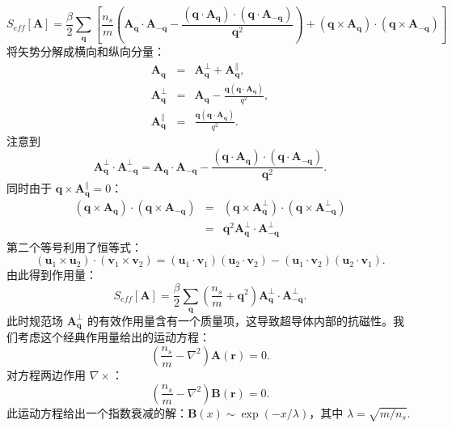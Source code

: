 \documentclass[10pt,UTF8]{ctexart}
\begin{document}
\begin{equation}
	S_{eff}[\bm A]=\frac{\beta}{2}\sum_{\bm q}\left[\frac{n_s}{m} \left(\bm A_{\bm q}\cdot \bm A_{-\bm q}-\frac{(\bm q\cdot \bm A_{\bm q})\cdot(\bm q\cdot \bm A_{-\bm q})}{\bm q^2} \right) + (\bm q \times \bm A_{\bm q})\cdot(\bm q \times \bm A_{-\bm q})\right]
\end{equation}
将矢势分解成横向和纵向分量：
\begin{eqnarray}
	\bm A_{\bm q} &=& \bm A_{\bm q}^\perp + \bm A_{\bm q}^\parallel, \nonumber \\
	\bm A_{\bm q}^\perp &=& \bm A_{\bm q} - \frac{\bm q(\bm q \cdot \bm A_{\bm q})}{q^2}, \nonumber \\
	\bm A_{\bm q}^\parallel &=& \frac{\bm q(\bm q \cdot \bm A_{\bm q})}{q^2}.
\end{eqnarray}
注意到
\begin{equation}
	\bm A_{\bm q}^\perp \cdot \bm A_{-\bm q}^\perp 
	= \bm A_{\bm q}\cdot \bm A_{-\bm q}-\frac{(\bm q\cdot \bm A_{\bm q})\cdot(\bm q\cdot \bm A_{-\bm q})}{\bm q^2}.
\end{equation}
同时由于 $\bm q \times \bm A_{\bm q}^\parallel = 0$：
\begin{eqnarray}
	(\bm q\times \bm A_{\bm q})\cdot(\bm q \times \bm A_{-\bm q})
	&=& (\bm q\times \bm A_{\bm q}^\perp)\cdot(\bm q \times \bm A_{-\bm q}^\perp) \nonumber \\
	&=& \bm q^2 \bm A_{\bm q}^\perp \cdot \bm A_{-\bm q}^\perp
\end{eqnarray}
第二个等号利用了恒等式：
\begin{equation}
	(\bm u_1 \times \bm u_2)\cdot(\bm v_1 \times \bm v_2) 
	= (\bm u_1 \cdot \bm v_1)(\bm u_2 \cdot \bm v_2)
	- (\bm u_1 \cdot \bm v_2)(\bm u_2 \cdot \bm v_1).
\end{equation} 
由此得到作用量：
\begin{equation}
	S_{eff}[\bm A] = \frac{\beta}{2} \sum_{\bm q}\left(\frac{n_s}{m}+\bm q^2\right)\bm A_{\bm q}^\perp \cdot \bm A_{-\bm q}^\perp.
\end{equation}
此时规范场 $\bm A_{\bm q}^\perp$ 的有效作用量含有一个质量项，这导致超导体内部的抗磁性。我们考虑这个经典作用量给出的运动方程：
\begin{equation}
	\left(\frac{n_s}{m}-\nabla^2 \right) \bm A(\bm r) = 0.
\end{equation}
对方程两边作用 $\nabla \times$：
\begin{equation}
	\left(\frac{n_s}{m}-\nabla^2 \right) \bm B(\bm r) = 0.
\end{equation}
此运动方程给出一个指数衰减的解：$\bm B(x) \sim \exp(-x/\lambda)$，其中 $\lambda = \sqrt{m/n_s}$.
\end{document}
